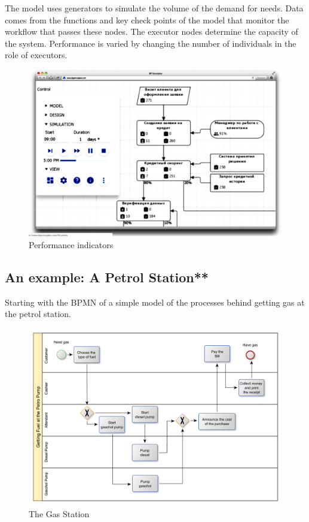 \documentclass[]{book}
\begin{document}
The model uses generators to simulate the volume of the demand for needs. Data comes from the functions and key check points of the model that monitor the workflow that passes these nodes. The executor nodes determine the capacity of the system. Performance is varied by changing the number of individuals in the role of executors.

\begin{figure}
\centering
\includegraphics{images/bpsim3.png}
\caption{Performance indicators}
\end{figure}

\hypertarget{an-example-a-petrol-station}{%
\subsection{An example: A Petrol Station**}\label{an-example-a-petrol-station}}

Starting with the BPMN of a simple model of the processes behind getting gas at the petrol station.

\begin{figure}
\centering
\includegraphics{images/gaspump.png}
\caption{The Gas Station}
\end{figure}
\end{document}
